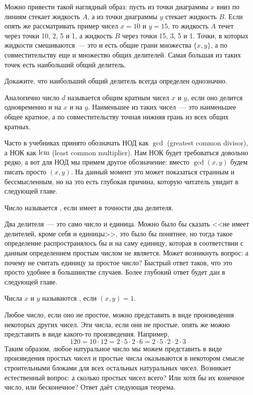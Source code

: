Можно привести такой наглядный образ: пусть из точки диаграммы $x$ вниз по линиям стекает жидкость $A$, а из точки диаграммы $y$ стекает жидкость $B$. Если опять же рассматривать пример чисел $x=10$ и $y=15$, то жидкость $A$ течет через точки 10, 2, 5 и 1, а жидкость $B$ через точки 15, 3, 5 и 1. Точки, в которых жидкости смешиваются~--- это и есть общие грани множества $\{x, y\}$, а по совместительству еще и множество общих делителей. Самая большая из таких точек есть наибольший общий делитель.

\begin{exercise}
Докажите, что наибольший общий делитель всегда определен однозначно.
\end{exercise}

Аналогично число $d$ называется общим кратным чисел $x$ и $y$, если оно делится одновременно и на $x$ и на $y$. Наименьшее из таких чисел~--- это наименьшее общее кратное, а по совместительству точная нижняя грань из всех общих кратных.

Часто в учебниках принято обозначать НОД как $\gcd$ (greatest common divisor), а НОК как $\operatorname{lcm}$ (least common multiplier). Нам НОК будет требоваться довольно редко, а вот для НОД мы примем другое обозначение: вместо $\gcd(x, y)$ будем писать просто $(x, y)$. На данный момент это может показаться странным и бессмысленным, но на это есть глубокая причина, которую читатель увидит в следующей главе.

\begin{definition}
Число называется , если имеет в точности два делителя.
\end{definition}

Два делителя~--- это само число и единица. Можно было бы сказать <<не имеет делителей, кроме себя и единицы>>, это было бы понятнее, но тогда такое определение распространялось бы и на саму единицу, которая в соответствии с данным определением простым числом не является. Может возникнуть вопрос: а почему не считать единицу за простое число? Быстрый ответ таков, что это просто удобнее в большинстве случаев. Более глубокий ответ будет дан в следующей главе.

\begin{definition}
Числа $x$ и $y$ называются , если $(x, y) = 1$.
\end{definition}

Любое число, если оно не простое, можно представить в виде произведения некоторых других чисел. Эти числа, если они не простые, опять же можно представить в виде какого-то произведения. Например,
$$120 = 10 \cdot 12 = 2\cdot 5 \cdot 2 \cdot 6 = 2\cdot 5 \cdot 2 \cdot 2 \cdot 3$$
Таким образом, любое натуральное число мы можем представить в виде произведения простых чисел и простые числа оказываются в некотором смысле строительными блоками для всех остальных натуральных чисел. Возникает естественный вопрос: а сколько простых чисел всего? Или хотя бы их конечное число, или бесконечное? Ответ даёт следующая теорема.

